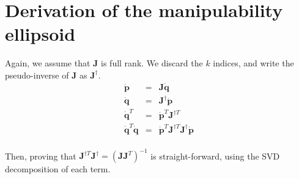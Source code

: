 \section{Derivation of the manipulability ellipsoid}
\label{app:manipulability}

Again, we assume that $\mathbf{J}$ is full rank. We discard the $k$ indices, and write the pseudo-inverse of $\mathbf{J}$ as $\mathbf{J}^{\dagger}$.
\begin{eqnarray*}
\mathbf{\dot{p}} & =  & \mathbf{J} \dot{\mathbf{q}} \\ 
\mathbf{\dot{q}} & =  & \mathbf{J}^{\dagger} \dot{\mathbf{p}} \\ 
\mathbf{\dot{q}}^T & =  & \dot{\mathbf{p}}^T \mathbf{J}^{\dagger T} \\ 
\mathbf{\dot{q}}^T\mathbf{\dot{q}} & =  & \dot{\mathbf{p}}^T \mathbf{J}^{\dagger T} \mathbf{J}^{\dagger} \dot{\mathbf{p}}\\ 
\end{eqnarray*}

Then, proving that $\mathbf{J}^{\dagger T} \mathbf{J}^{\dagger} = (\mathbf{J}\mathbf{J}^T)^{-1}$ is straight-forward,
using the SVD decomposition of each term.
